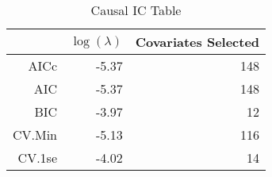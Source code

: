 \begin{table}[ht]
\centering
\begin{tabular}{rrr}
  \hline
 & $\log(\lambda)$ & Covariates Selected \\ 
  \hline
AICc & -5.37 & 148 \\ 
  AIC & -5.37 & 148 \\ 
  BIC & -3.97 &  12 \\ 
  CV.Min & -5.13 & 116 \\ 
  CV.1se & -4.02 &  14 \\ 
   \hline
\end{tabular}
\caption{Causal IC Table} 
\label{tab:causal_ic}
\end{table}
